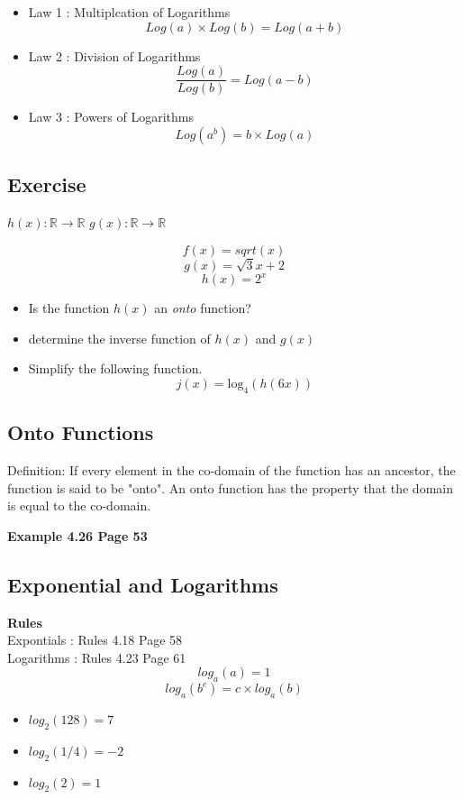 \documentclass[12pt]{article}
\begin{document}
\begin{itemize}
\item Law 1 : Multiplcation of Logarithms
\[ Log(a) \times Log(b) = Log(a+b) \]
\item Law 2 : Division of Logarithms
\[ \frac{Log(a)}{Log(b)} = Log(a-b) \]
\item Law 3 : Powers of Logarithms
\[ Log(a^b) = b \times Log(a) \]
\end{itemize}



\subsection{Exercise} 
$h(x): \mathbb{R} \rightarrow \mathbb{R}$ 
$g(x): \mathbb{R} \rightarrow \mathbb{R}$

\[f(x) = sqrt(x)\]
\[g(x) = \sqrt{3}{x+2}\]
\[h(x) = 2^x\]

\begin{itemize}
\item Is the function $h(x)$ an \textit{onto} function?
\item determine the inverse function of $h(x)$ and $g(x)$
\item Simplify the following function.
\[ j(x) = \mbox{log}_4(h(6x))\]
\end{itemize}
\subsection{Onto Functions}
Definition: If every element in the co-domain of the function has an ancestor, the function is said to be "onto".
An onto function has the property that the domain is equal to the co-domain.


\textbf{Example 4.26 Page 53}

\subsection*{Exponential and Logarithms}

\textbf{Rules}\\
Expontials : Rules 4.18 Page 58 \\
Logarithms : Rules 4.23 Page 61 \\

\[ log_a(a) = 1 \]
\[ log_a(b^c) = c \times log_a(b) \]

\begin{itemize}
\item $log_2(128) = 7$
\item $log_2(1/4) = -2$
\item $log_2(2) = 1$
\end{itemize}
\end{document}
